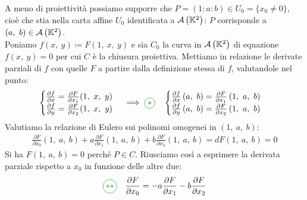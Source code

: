 \begin{demonstration}
	A meno di proiettività possiamo supporre che $P=(1\colon a\colon b)\in U_0=\{x_0\neq 0\}$, cioè che stia nella carta affine $U_0$ identificata a ${\mathcal{A}\left(\mathbb{K}^2\right)}$: $P$ corrisponde a $\left(a,\ b\right)\in\aff{\kamp^2}$.\\
	Poniamo $f\left(x,\ y\right)\coloneqq F(1,\ x,\ y)$ e sia $C_0$ la curva in ${\mathcal{A}\left(\mathbb{K}^2\right)}$ di equazione $f\left(x,\ y\right)=0$ per cui $C$ è la chiusura proiettiva. Mettiamo in relazione le derivate parziali di $f$ con quelle $F$ a partire dalla definizione stessa di $f$,
	valutandole nel punto:
		\begin{gather*}
			\begin{cases}
				\frac{\partial{f}}{\partial{x}} = \frac{\partial{F}}{\partial{x_1}} (1,\ x,\ y)\\
				\frac{\partial{f}}{\partial{y}} = \frac{\partial{F}}{\partial{x_2}} (1,\ x,\ y)
			\end{cases}
			\implies \textcolor{green}{\circled{\ast}}\quad
			\begin{cases}
				\frac{\partial{f}}{\partial{x}}\left(a,\ b\right) = \frac{\partial{F}}{\partial{x_1}} \left(1,\ a,\ b\right)\\
				\frac{\partial{f}}{\partial{y}}\left(a,\ b\right) = \frac{\partial{F}}{\partial{x_2}} \left(1,\ a,\ b\right)
			\end{cases}
		\end{gather*}
	Valutiamo la relazione di Eulero sui polinomi omogenei in $\left(1,\ a,\ b\right)$:
		\begin{gather*}
			\frac{\partial{F}}{\partial{x_0}}\left(1,\ a,\ b\right) + a\frac{\partial{F}}{\partial{x_1}}\left(1,\ a,\ b\right) + b\frac{\partial{F}}{\partial{x_2}}\left(1,\ a,\ b\right)= dF\left(1,\ a,\ b\right)=0
		\end{gather*}
	Si ha $F\left(1,\ a,\ b\right)=0$ perché $P\in C$. Riusciamo così a esprimere la derivata parziale rispetto a $x_0$ in funzione delle altre due:
		\begin{gather*}
			\textcolor{green}{\circled{\ast\ast}}\quad \frac{\partial{F}}{\partial{x_0}}=-a\frac{\partial{F}}{\partial{x_1}} -b\frac{\partial{F}}{\partial{x_2}}

\end{gather*}
\end{demonstration}
